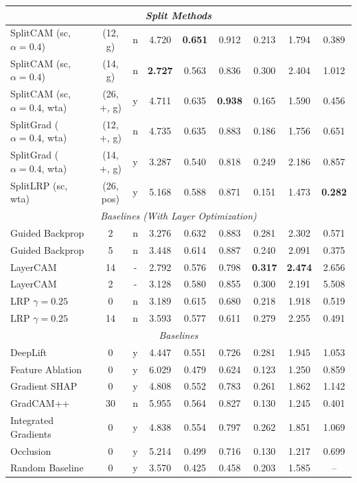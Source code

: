 \begin{table}[htb!]
\begin{tabular}{p{4cm}|cc|cccccc}
        \midrule
        \multicolumn{9}{c}{\textit{Split Methods}} \\
        \midrule
        SplitCAM (sc, $\alpha = 0.4$) & (12, g) & n & 4.720 & \fboxsep=0.5pt\colorbox{red!20}{\textbf{0.651}} & 0.912 & 0.213 & 1.794 & 0.389 \\
        SplitCAM (sc, $\alpha = 0.4$) & (14, g) & n & \fboxsep=0.5pt\colorbox{red!20}{\textbf{2.727}} & 0.563 & 0.836 & 0.300 & 2.404 & 1.012 \\
        SplitCAM (sc, $\alpha = 0.4$, wta) & (26, +, g) & y & 4.711 & 0.635 & \fboxsep=0.5pt\colorbox{red!20}{\textbf{0.938}} & 0.165 & 1.590 & 0.456 \\
        SplitGrad ($\alpha = 0.4$, wta) & (12, +, g) & n & 4.735 & 0.635 & 0.883 & 0.186 & 1.756 & 0.651 \\
        SplitGrad ($\alpha = 0.4$, wta) & (14, +, g) & y & 3.287 & 0.540 & 0.818 & 0.249 & 2.186 & 0.857 \\
        SplitLRP (sc, wta) & (26, pos) & y & 5.168 & 0.588 & 0.871 & 0.151 & 1.473 & \fboxsep=0.5pt\colorbox{red!20}{\textbf{0.282}} \\
        \midrule
        \multicolumn{9}{c}{\textit{Baselines (With Layer Optimization)}} \\
        \midrule
        Guided Backprop & 2 & n & 3.276 & 0.632 & 0.883 & 0.281 & 2.302 & 0.571 \\
        Guided Backprop & 5 & n & 3.448 & 0.614 & 0.887 & 0.240 & 2.091 & 0.375 \\
        LayerCAM & 14 & - & 2.792 & 0.576 & 0.798 & \fboxsep=0.5pt\colorbox{red!20}{\textbf{0.317}} & \fboxsep=0.5pt\colorbox{red!20}{\textbf{2.474}} & 2.656 \\
        LayerCAM & 2 & - & 3.128 & 0.580 & 0.855 & 0.300 & 2.191 & 5.508 \\
        LRP $\gamma=0.25$ & 0 & n & 3.189 & 0.615 & 0.680 & 0.218 & 1.918 & 0.519 \\
        LRP $\gamma=0.25$ & 14 & n & 3.593 & 0.577 & 0.611 & 0.279 & 2.255 & 0.491 \\
        \midrule
        \multicolumn{9}{c}{\textit{Baselines}} \\
        \midrule
        DeepLift & 0 & y & 4.447 & 0.551 & 0.726 & 0.281 & 1.945 & 1.053 \\
        Feature Ablation & 0 & y & 6.029 & 0.479 & 0.624 & 0.123 & 1.250 & 0.859 \\
        Gradient SHAP & 0 & y & 4.808 & 0.552 & 0.783 & 0.261 & 1.862 & 1.142 \\
        GradCAM++ & 30 & n & 5.955 & 0.564 & 0.827 & 0.130 & 1.245 & 0.401 \\
        Integrated Gradients & 0 & y & 4.838 & 0.554 & 0.797 & 0.262 & 1.851 & 1.069 \\
        Occlusion & 0 & y & 5.214 & 0.499 & 0.716 & 0.130 & 1.217 & 0.699 \\
        Random Baseline & 0 & y & 3.570 & 0.425 & 0.458 & 0.203 & 1.585 & -- \\
        \bottomrule
    \end{tabular}

\end{table}
